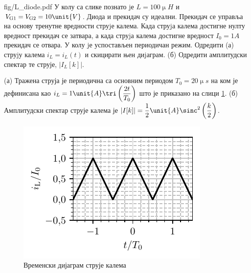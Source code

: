 \begin{slikaDesno}[0.833]{fig/L_diode.pdf}
    \PID 
    У колу са слике познато jе $L = 100\unit{\upmu H}$ и 
    $V_{\rm G1} = V_{\rm G2} = 10\unit{V}$. Диода и
    прекидач су идеални. Прекидач се управља на основу тренутне вредности
    струjе калема. Када струjа калема достигне нулту вредност прекидач се
    затвара, а када струjа калема достигне вредност $I_0 = 1\unit{A}$ прекидач се
    отвара. У колу jе успостављен периодичан режим. 
    Одредити (а) струjу
    калема $i_L = i_L (t)$ и скицирати њен диjаграм. 
    (б) Одредити амплитудски спектар те струје, $|I_L [k]|$.    
\end{slikaDesno}

\REZULTAT 
(а) Тражена струја је периодична са основним периодом $T_0 = 20\unit{\upmu s}$ на ком је дефинисана као 
$i_L = 1\unit{A} \tri\left(\dfrac{2t}{T_0}\right)$ што је приказано на слици \ref{fig:\ID.iL}. 
(б) Амплитудски спектар струје калема је 
$|I[k]| = \dfrac{1}{2}\unit{A} \sinc^2\left( \dfrac{k}{2} \right)$.

\begin{figure}[ht!]
    \centering
    \includegraphics{fig/L_diode_iLL}
    \caption{Временски дијаграм струје калема}
    \label{fig:\ID.iL}
\end{figure}